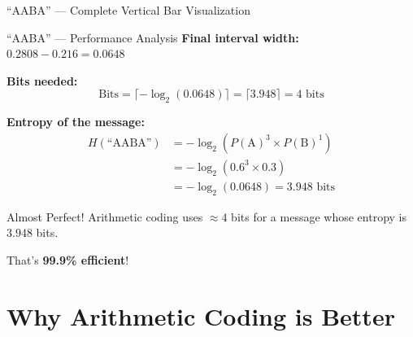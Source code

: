 \documentclass[aspectratio=169,12pt]{beamer}
\begin{document}
\begin{frame}{``AABA'' --- Complete Vertical Bar Visualization}
\begin{center}
    \end{center}
\end{frame}


\begin{frame}{``AABA'' --- Performance Analysis}
    \textbf{Final interval width:} $0.2808 - 0.216 = 0.0648$
    
    \vspace{0.3cm}
    \textbf{Bits needed:}
    \begin{equation*}
        \text{Bits} = \lceil -\log_2(0.0648) \rceil = \lceil 3.948 \rceil = 4 \text{ bits}
    \end{equation*}
    
    \textbf{Entropy of the message:}
    \begin{align*}
        H(\text{``AABA''}) &= -\log_2(P(\text{A})^3 \times P(\text{B})^1) \\
        &= -\log_2(0.6^3 \times 0.3) \\
        &= -\log_2(0.0648) = 3.948 \text{ bits}
    \end{align*}
    
    \begin{alertblock}{Almost Perfect!}
        Arithmetic coding uses $\approx 4$ bits for a message whose entropy is $3.948$ bits.
        
        That's \textbf{99.9\% efficient}!
    \end{alertblock}
\end{frame}

\section{Why Arithmetic Coding is Better}
\end{document}
